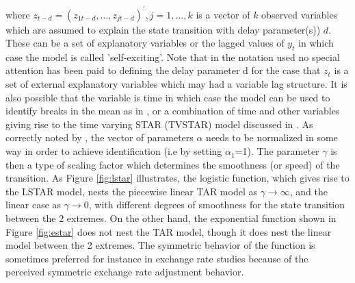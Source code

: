 where ${z_{t-d}} = {\left( {{z_{1{t-d}}},\dots,{z_{j{t-d}}}} \right)^\prime },j = 1,\dots,k$
is a vector of $k$ observed variables which are assumed to explain the state
transition with delay parameter(s)) $d$. These can be a set of explanatory
variables or the lagged values of $y_t$ in which case the model is called 'self-exciting'.
Note that in the notation used no special attention has been paid to defining
the delay parameter d for the case that $z_t$ is a set of external explanatory
variables which may had a variable lag structure. It is also possible that the
variable is time in which case the model can be used to identify breaks in the
mean as in \cite{Lin1994}, or a combination of time and other variables giving 
rise to the time varying STAR (TVSTAR) model discussed in \cite{Lundbergh2003}. 
As correctly noted by \cite{Dijk1999}, the vector of parameters $\alpha$ needs 
to be normalized in some way in order to achieve identification (i.e by setting 
$\alpha_1$=1). The parameter $\gamma$ is then a type of scaling factor which 
determines the smoothness (or speed) of the transition. As Figure
\ref{fig:lstar} illustrates, the logistic function, which gives rise to the
LSTAR model, nests the piecewise linear TAR model as $\gamma  \to \infty$, and
the linear case as $\gamma  \to 0$, with different degrees of smoothness for the
state transition between the 2 extremes. On the other hand, the exponential
function shown in Figure \ref{fig:estar} does not nest the TAR model, though it
does nest the linear model between the 2 extremes. The symmetric behavior of the
function is sometimes preferred for instance in exchange rate studies because of
the perceived symmetric exchange rate adjustment behavior.

